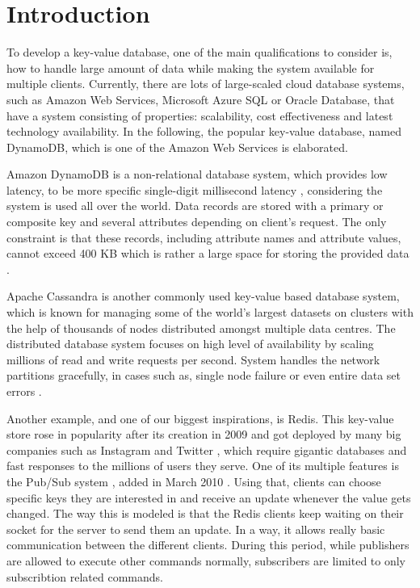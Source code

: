 \section{Introduction}
\label{sec:introduction}

To develop a key-value database, one of the main qualifications to consider is, how to handle large amount of data while making the system available for multiple clients. Currently, there are lots of large-scaled cloud database systems, such as Amazon Web Services, Microsoft Azure SQL or Oracle Database, that have a system consisting of properties: scalability, cost effectiveness and latest technology availability. In the following, the popular key-value database, named DynamoDB, which is one of the Amazon Web Services is elaborated. 

Amazon DynamoDB is a non-relational database system, which provides low latency, to be more specific single-digit millisecond latency \cite{amazon}, considering the system is used all over the world. Data records are stored with a primary or composite key and several attributes depending on client's request. The only constraint is that these records, including attribute names and attribute values, cannot exceed 400 KB which is rather a large space for storing the provided data \cite{amazon}.

Apache Cassandra is another commonly used key-value based database system, which is known for managing some of the world's largest datasets on clusters with the help of thousands of nodes distributed amongst multiple data centres. The distributed database system focuses on high level of availability by scaling millions of read and write requests per second. System handles the network partitions gracefully, in cases such as, single node failure or even entire data set errors \cite{chebotko2015big}.

Another example, and one of our biggest inspirations, is Redis. This key-value store rose in popularity after its creation in 2009 and got deployed by many big companies such as Instagram \cite{krieger2011instagram} and Twitter \cite{yu2014twitter}, which require gigantic databases and fast responses to the millions of users they serve. One of its multiple features is the Pub/Sub system \cite{redis2020pubsub}, added in March 2010 \cite{sanfilippo2010pubsub}. Using that, clients can choose specific keys they are interested in and receive an update whenever the value gets changed. The way this is modeled is that the Redis clients keep waiting on their socket for the server to send them an update. In a way, it allows really basic communication between the different clients.
During this period, while publishers are allowed to execute other commands normally, subscribers are limited to only subscribtion related commands.

